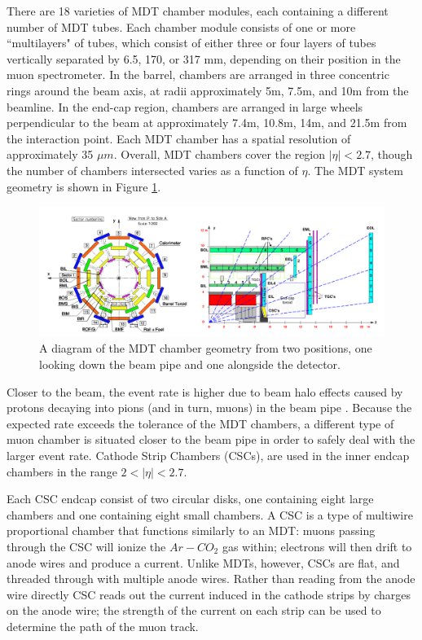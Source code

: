 There are 18 varieties of MDT chamber modules, each containing a different number of MDT tubes. Each chamber module consists of one or more ``multilayers" of tubes, which consist of either three or four layers of tubes vertically separated by 6.5, 170, or 317 mm, depending on their position in the muon spectrometer. In the barrel, chambers are arranged in three concentric rings around the beam axis, at radii approximately 5m, 7.5m, and 10m from the beamline. In the end-cap region, chambers are arranged in large wheels perpendicular to the beam at approximately 7.4m, 10.8m, 14m, and 21.5m from the interaction point. Each MDT chamber has a spatial resolution of approximately 35 $\mu m$. Overall, MDT chambers cover the region $ |\eta | < 2.7$, though the number of chambers intersected varies as a function of $\eta$. The MDT system geometry is shown in Figure \ref{fig:MDTChamber}. 

\begin{figure}[ht!]
  \includegraphics[width=\linewidth]{figures/detector_chapter/MDTChamber.png}
  \caption{A diagram of the MDT chamber geometry from two positions, one looking down the beam pipe and one alongside the detector. \cite{ATLAS_Jinst}}
  \label{fig:MDTChamber}
\end{figure}

Closer to the beam, the event rate is higher due to beam halo effects caused by protons decaying into pions (and in turn, muons) in the beam pipe \cite{Boudreau}. Because the expected rate exceeds the tolerance of the MDT chambers, a different type of muon chamber is situated closer to the beam pipe in order to safely deal with the larger event rate. Cathode Strip Chambers (CSCs), are used in the inner endcap chambers in the range $ 2 < | \eta | < 2.7 $.

Each CSC endcap consist of two circular disks, one containing eight large chambers and one containing eight small chambers. A CSC is a type of multiwire proportional chamber that functions similarly to an MDT: muons passing through the CSC will ionize the $Ar-CO_2$ gas within; electrons will then drift to anode wires and produce a current. Unlike MDTs, however, CSCs are flat, and threaded through with multiple anode wires. Rather than reading from the anode wire directly CSC reads out the current induced in the cathode strips by charges on the anode wire; the strength of the current on each strip can be used to determine the path of the muon track.


